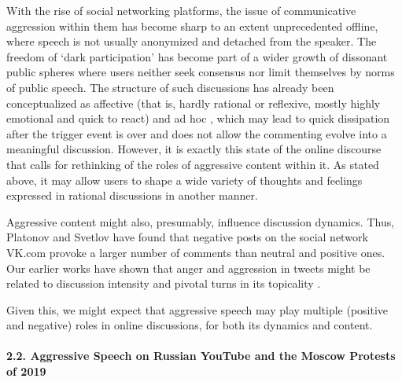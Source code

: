 With the rise of social networking platforms, the issue of communicative aggression within them has become sharp to an extent unprecedented offline, where speech is not usually anonymized and detached from the speaker. The freedom of ‘dark participation’ has become part of a wider growth of dissonant public spheres \cite{Pfetsch} where users neither seek consensus nor limit themselves by norms of public speech. The structure of such discussions has already been conceptualized as affective (that is, hardly rational or reflexive, mostly highly emotional and quick to react) \cite{Papacharissi} and ad hoc \cite{BrunsBurgess}, which may lead to quick dissipation after the trigger event is over and does not allow the commenting evolve into a meaningful discussion. However, it is exactly this state of the online discourse that calls for rethinking of the roles of aggressive content within it. As stated above, it may allow users to shape a wide variety of thoughts and feelings expressed in rational discussions in another manner.

Aggressive content might also, presumably, influence discussion dynamics. Thus, Platonov and Svetlov \cite{PlatonovSvetlov} have found that negative posts on the social network VK.com provoke a larger number of comments than neutral and positive ones. Our earlier works have shown that anger and aggression in tweets might be related to discussion intensity and pivotal turns in its topicality \cite{BodrunovaNigmatullinaBlekanov,SmoliarovaBodrunovaYakunin}.

Given this, we might expect that aggressive speech may play multiple (positive and negative) roles in online discussions, for both its dynamics and content.

\paragraph{2.2. Aggressive Speech on Russian YouTube and the Moscow Protests of 2019}\par

